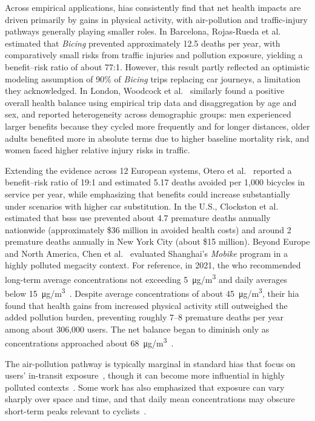 Across empirical applications, \acp{hia} consistently find that net health impacts are driven primarily by gains in physical activity, with air-pollution and traffic-injury pathways generally playing smaller roles. In Barcelona, Rojas-Rueda et al.~\cite{Rojas-Rueda2011} estimated that \textit{Bicing} prevented approximately 12.5 deaths per year, with comparatively small risks from traffic injuries and pollution exposure, yielding a benefit--risk ratio of about 77:1. However, this result partly reflected an optimistic modeling assumption of 90\% of \textit{Bicing} trips replacing car journeys, a limitation they acknowledged. In London, Woodcock et al.~\cite{Woodcock2014} similarly found a positive overall health balance using empirical trip data and disaggregation by age and sex, and reported heterogeneity across demographic groups: men experienced larger benefits because they cycled more frequently and for longer distances, older adults benefited more in absolute terms due to higher baseline mortality risk, and women faced higher relative injury risks in traffic.
 
Extending the evidence across 12 European systems, Otero et al.~\cite{Otero2018} reported a benefit--risk ratio of 19:1 and estimated 5.17 deaths avoided per 1,000 bicycles in service per year, while emphasizing that benefits could increase substantially under scenarios with higher car substitution. In the U.S., Clockston et al.~\cite{Clockston2021} estimated that \acp{bss} use prevented about 4.7 premature deaths annually nationwide (approximately \$36 million in avoided health costs) and around 2 premature deaths annually in New York City (about \$15 million). Beyond Europe and North America, Chen et al.~\cite{Chen2023} evaluated Shanghai’s \textit{Mobike} program in a highly polluted megacity context. For reference, in 2021, the \ac{who} recommended long-term average  concentrations not exceeding 5~\si{\micro g/m^3} and daily averages below 15~\si{\micro g/m^3}~\cite{WHO2021}. Despite average  concentrations of about 45~\si{\micro g/m^3}, their \ac{hia} found that health gains from increased physical activity still outweighed the added pollution burden, preventing roughly 7--8 premature deaths per year among about 306,000 users. The net balance began to diminish only as concentrations approached about 68~\si{\micro g/m^3}~\cite{Chen2023}.

The air-pollution pathway is typically marginal in standard \acp{hia} that focus on users' in-transit exposure~\cite{Rojas-Rueda2011, Woodcock2014, Otero2018, Clockston2021}, though it can become more influential in highly polluted contexts~\cite{Chen2023}. Some work has also emphasized that exposure can vary sharply over space and time, and that daily mean concentrations may obscure short-term peaks relevant to cyclists~\cite{Cao2021}.

